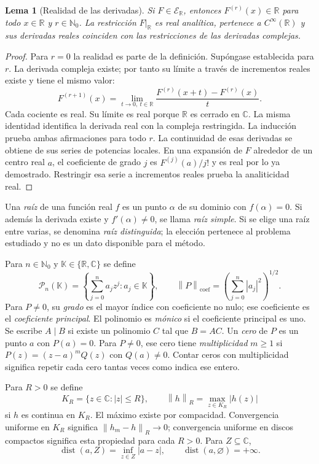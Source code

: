 \documentclass[11pt,a4paper]{article}
\numberwithin{equation}{section}
\newtheorem{lemma}[theorem]{Lema}
\theoremstyle{definition}
\theoremstyle{remark}
\newcommand{\R}{\mathbb R}
\newcommand{\C}{\mathbb C}
\newcommand{\Nn}{\mathbb N_0}
\newcommand{\PP}{\mathcal P}
\newcommand{\ER}{\mathcal E_{\R}}
\newcommand{\norm}[1]{\left\lVert#1\right\rVert}
\DeclareMathOperator{\dist}{dist}
\begin{document}
\begin{lemma}[Realidad de las derivadas]\label{lem:real}
Si $F\in\ER$, entonces $F^{(r)}(x)\in\R$ para todo $x\in\R$ y $r\in\Nn$. La restricción $F|_\R$ es real analítica, pertenece a $C^\infty(\R)$ y sus derivadas reales coinciden con las restricciones de las derivadas complejas.
\end{lemma}
\begin{proof}
Para $r=0$ la realidad es parte de la definición. Supóngase establecida para $r$. La derivada compleja existe; por tanto su límite a través de incrementos reales existe y tiene el mismo valor:
\[
F^{(r+1)}(x)=\lim_{t\to0,\ t\in\R}\frac{F^{(r)}(x+t)-F^{(r)}(x)}{t}.
\]
Cada cociente es real. Su límite es real porque $\R$ es cerrado en $\C$. La misma identidad identifica la derivada real con la compleja restringida. La inducción prueba ambas afirmaciones para todo $r$. La continuidad de esas derivadas se obtiene de sus series de potencias locales. En una expansión de $F$ alrededor de un centro real $a$, el coeficiente de grado $j$ es $F^{(j)}(a)/j!$ y es real por lo ya demostrado. Restringir esa serie a incrementos reales prueba la analiticidad real.
\end{proof}

Una \emph{raíz} de una función real $f$ es un punto $\alpha$ de su dominio con $f(\alpha)=0$. Si además la derivada existe y $f'(\alpha)\ne0$, se llama \emph{raíz simple}. Si se elige una raíz entre varias, se denomina \emph{raíz distinguida}; la elección pertenece al problema estudiado y no es un dato disponible para el método.

Para $n\in\Nn$ y $\mathbb K\in\{\R,\C\}$ se define
\[
\PP_n(\mathbb K)=\left\{\sum_{j=0}^na_jz^j:a_j\in\mathbb K\right\},\qquad
\norm{P}_{\mathrm{coef}}=\left(\sum_{j=0}^n|a_j|^2\right)^{1/2}.
\]
Para $P\ne0$, su \emph{grado} es el mayor índice con coeficiente no nulo; ese coeficiente es el \emph{coeficiente principal}. El polinomio es \emph{mónico} si el coeficiente principal es uno. Se escribe $A\mid B$ si existe un polinomio $C$ tal que $B=AC$. Un \emph{cero} de $P$ es un punto $a$ con $P(a)=0$. Para $P\ne0$, ese cero tiene \emph{multiplicidad} $m\ge1$ si $P(z)=(z-a)^mQ(z)$ con $Q(a)\ne0$. Contar ceros con multiplicidad significa repetir cada cero tantas veces como indica ese entero.

Para $R>0$ se define
\[
K_R=\{z\in\C:|z|\le R\},\qquad
\norm{h}_R=\max_{z\in K_R}|h(z)|
\]
si $h$ es continua en $K_R$. El máximo existe por compacidad. Convergencia uniforme en $K_R$ significa $\norm{h_m-h}_R\to0$; convergencia uniforme en discos compactos significa esta propiedad para cada $R>0$. Para $Z\subseteq\C$,
\[
\dist(a,Z)=\inf_{z\in Z}|a-z|,\qquad \dist(a,\varnothing)=+\infty.
\]
\end{document}
